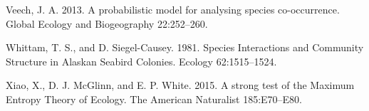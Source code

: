 \documentclass[12pt,]{article}
\begin{document}
\begin{spacing}{1.9}
\begin{flushleft}
Veech, J. A. 2013. A probabilistic model for analysing species
co-occurrence. Global Ecology and Biogeography 22:252--260.

Whittam, T. S., and D. Siegel-Causey. 1981. Species Interactions and
Community Structure in Alaskan Seabird Colonies. Ecology 62:1515--1524.

Xiao, X., D. J. McGlinn, and E. P. White. 2015. A strong test of the
Maximum Entropy Theory of Ecology. The American Naturalist 185:E70--E80.
\end{flushleft}
\end{spacing}
\end{document}
